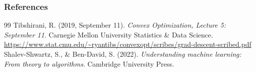 \documentclass[11pt,compress,t,notes=noshow, xcolor=table]{beamer}
\begin{document}
\begin{vbframe}
\frametitle{References}
\footnotesize{
\begin{thebibliography}{99}
Tibshirani, R. (2019, September 11). \textit{Convex Optimization, Lecture 5: September 11}. Carnegie Mellon University Statistics \& Data Science. \url{https://www.stat.cmu.edu/~ryantibs/convexopt/scribes/grad-descent-scribed.pdf}
 Shalev-Shwartz, S., \& Ben-David, S. (2022). \textit{Understanding machine learning: From theory to algorithms}. Cambridge University Press. 
\end{thebibliography}
}
\end{vbframe}

\endlecture
\end{document}
